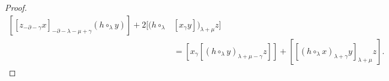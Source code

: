 \documentclass[10pt,a4paper]{amsart}
\begin{document}
\begin{proof}
\begin{align*}
      [[z_{-\partial-\gamma}x]_{-\partial-\lambda-\mu+\gamma}(h\circ_{\lambda}y)]+2[(h\circ_{\lambda}&[x_{\gamma}y])_{\lambda+\mu}z] \nonumber\\
      &=[x_{\gamma}[(h\circ_{\lambda}y)_{\lambda+\mu-\gamma}z]]+[[(h\circ_{\lambda}x)_{\lambda+\gamma}y]_{\lambda+\mu}z].

\end{align*}
\end{proof}
\end{document}
